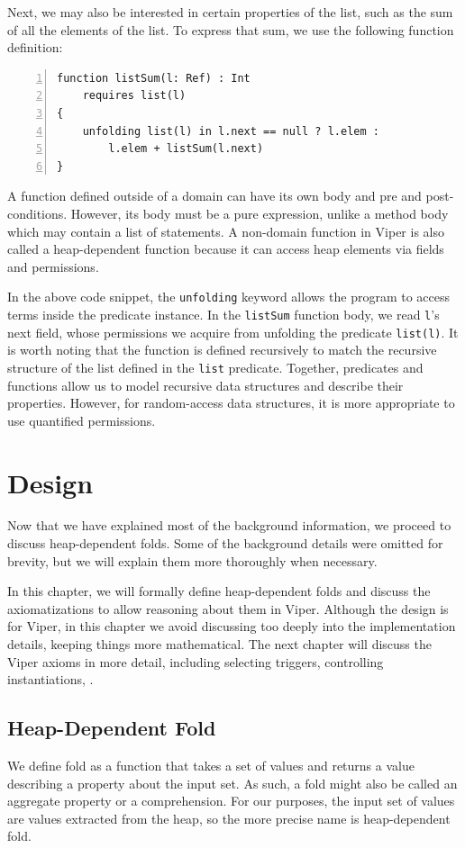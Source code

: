 \documentclass[msc,oneside]{ubcthesis}
\theoremstyle{definition}
\begin{document}
Next, we may also be interested in certain properties of the list, such as the sum of all the elements of the list. To express that sum, we use the following function definition:

\begin{lstlisting}[language=silver,numbers=left, firstnumber=1, stepnumber=1]
function listSum(l: Ref) : Int
    requires list(l)
{
    unfolding list(l) in l.next == null ? l.elem : 
        l.elem + listSum(l.next)
}
\end{lstlisting}

A function defined outside of a domain can have its own body and pre and post-conditions. However, its body must be a pure expression, unlike a method body which may contain a list of statements. A non-domain function in Viper is also called a heap-dependent function because it can access heap elements via fields and permissions.

In the above code snippet, the \lstinline|unfolding| keyword allows the program to access terms inside the predicate instance. In the \lstinline|listSum| function body, we read \lstinline|l|’s next field, whose permissions we acquire from unfolding the predicate \lstinline|list(l)|. It is worth noting that the function is defined recursively to match the recursive structure of the list defined in the \lstinline|list| predicate. Together, predicates and functions allow us to model recursive data structures and describe their properties. However, for random-access data structures, it is more appropriate to use quantified permissions.

\chapter{Design}
Now that we have explained most of the background information, we proceed to discuss heap-dependent folds. Some of the background details were omitted for brevity, but we will explain them more thoroughly when necessary.

In this chapter, we will formally define heap-dependent folds and discuss the axiomatizations to allow reasoning about them in Viper. Although the design is for Viper, in this chapter we avoid discussing too deeply into the implementation details, keeping things more mathematical. The next chapter will discuss the Viper axioms in more detail, including selecting triggers, controlling instantiations, \etc.

\section{Heap-Dependent Fold}
We define fold as a function that takes a set of values and returns a value describing a property about the input set. As such, a fold might also be called an aggregate property or a comprehension. For our purposes, the input set of values are values extracted from the heap, so the more precise name is heap-dependent fold.
\end{document}
